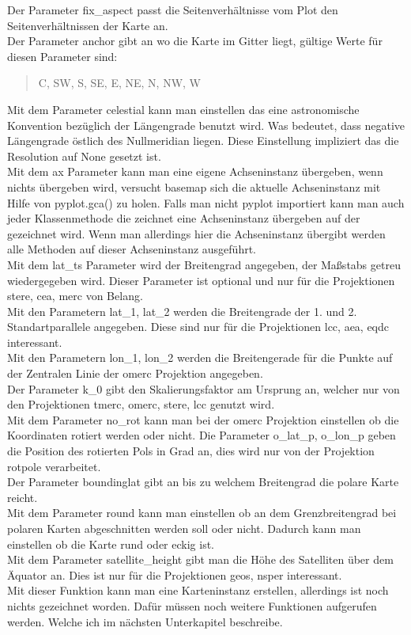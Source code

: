   Der Parameter \textsf{fix\_aspect} passt die Seitenverhältnisse vom Plot den Seitenverhältnissen der Karte an.\\
  Der Parameter \textsf{anchor} gibt an wo die Karte im Gitter liegt, gültige Werte für diesen Parameter sind:\\
  \begin{verse}
  \textsf{C, SW, S, SE, E, NE, N, NW, W}
  \end{verse}
  Mit dem Parameter \textsf{celestial} kann man einstellen das eine astronomische Konvention bezüglich der Längengrade benutzt wird. Was bedeutet, dass negative Längengrade östlich des Nullmeridian liegen.
  Diese Einstellung impliziert das die Resolution auf \textsf{None} gesetzt ist.\\
  Mit dem \textsf{ax} Parameter kann man eine eigene Achseninstanz übergeben, wenn nichts übergeben wird, versucht \textsf{basemap} sich die aktuelle Achseninstanz mit Hilfe von \textsf{pyplot.gca()} zu holen. Falls man nicht \textsf{pyplot} importiert kann man auch jeder Klassenmethode die zeichnet eine Achseninstanz übergeben auf der gezeichnet wird. Wenn man allerdings hier die Achseninstanz übergibt werden alle Methoden auf dieser Achseninstanz ausgeführt.\\
  Mit dem \textsf{lat\_ts} Parameter wird der Breitengrad angegeben, der Maßstabs getreu wiedergegeben wird. Dieser Parameter ist optional und nur für die Projektionen \textsf{stere, cea, merc} von Belang.\\
  Mit den Parametern \textsf{lat\_1, lat\_2} werden die Breitengrade der 1. und 2. Standartparallele angegeben. Diese sind nur für die Projektionen \textsf{lcc, aea, eqdc} interessant.\\
  Mit den Parametern \textsf{lon\_1, lon\_2} werden die Breitengerade für die Punkte auf der Zentralen Linie der \textsf{omerc} Projektion angegeben.\\
  Der Parameter \textsf{k\_0} gibt den Skalierungsfaktor am Ursprung an, welcher nur von den Projektionen \textsf{tmerc, omerc, stere, lcc} genutzt wird.\\
  Mit dem Parameter \textsf{no\_rot} kann man bei der \textsf{omerc} Projektion einstellen ob die Koordinaten rotiert werden oder nicht.
  Die Parameter \textsf{o\_lat\_p, o\_lon\_p} geben die Position des rotierten Pols in Grad an, dies wird nur von der Projektion \textsf{rotpole} verarbeitet.\\
  Der Parameter \textsf{boundinglat} gibt an bis zu welchem Breitengrad die polare Karte reicht.\\
  Mit dem Parameter \textsf{round} kann man einstellen ob an dem Grenzbreitengrad bei polaren Karten abgeschnitten werden soll oder nicht. Dadurch kann man einstellen ob die Karte rund oder eckig ist.\\
  Mit dem Parameter \textsf{satellite\_height} gibt man die Höhe des Satelliten über dem Äquator an. 
  Dies ist nur für die Projektionen \textsf{geos, nsper} interessant.\\
  Mit dieser Funktion kann man eine Karteninstanz erstellen, allerdings ist noch nichts gezeichnet worden.
  Dafür müssen noch weitere Funktionen aufgerufen werden. Welche ich im nächsten Unterkapitel beschreibe.